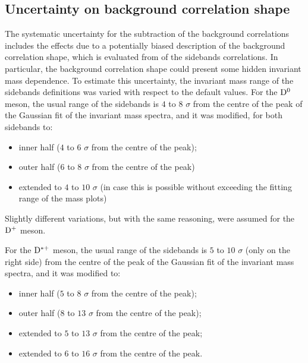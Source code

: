 \subsection{Uncertainty on background correlation shape}
The systematic uncertainty for the subtraction of the background correlations includes the effects due to a potentially biased description of the background correlation shape, which is evaluated from of the sidebands correlations. In particular, the background correlation shape could present some hidden invariant mass dependence. To estimate this uncertainty, the invariant mass range of the sidebands definitions was varied with respect to the default values. For the ${\rm D^0}$ meson, the usual range of the sidebands is $4$ to $8$ $\sigma$ from the centre of the peak of the Gaussian fit of the invariant mass spectra, and it was modified, for both sidebands to:
\begin{itemize}
    \item inner half ($4$ to $6$ $\sigma$ from the centre of the peak);
    \item outer half ($6$ to $8$ $\sigma$ from the centre of the peak)
    \item extended to $4$ to $10$ $\sigma$ (in case this is possible without exceeding the fitting range of the mass plots)
\end{itemize}

Slightly different variations, but with the same reasoning, were assumed for the ${\rm D^+}$ meson.

For the ${\rm D^{*+}}$ meson, the usual range of the sidebands is $5$ to $10$ $\sigma$ (only on the right side) from the centre of the peak of the Gaussian fit of the invariant mass spectra,  and it was modified to:
\begin{itemize}
    \item inner half ($5$ to $8$ $\sigma$ from the centre of the peak);
    \item outer half ($8$ to $13$ $\sigma$ from the centre of the peak);
    \item extended to $5$ to $13$ $\sigma$ from the centre of the peak;
     \item extended to $6$ to $16$ $\sigma$ from the centre of the peak.
\end{itemize}

